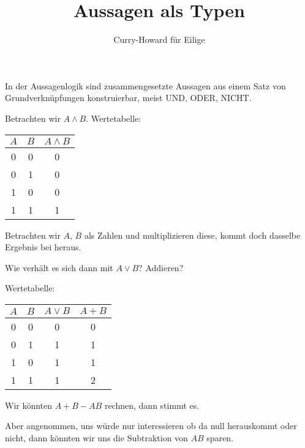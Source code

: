\documentclass[9pt]{beamer}
\title{Aussagen als Typen}
\subtitle{Curry-Howard für Eilige}
\date{}
\begin{document}
\begin{frame}
\maketitle
\end{frame}

\begin{frame}
In der Aussagenlogik sind zusammengesetzte Aussagen aus einem
Satz von Grundverknüpfungen konstruierbar, meist UND, ODER, NICHT.\pause

\vspace{1em}
Betrachten wir $A\land B$.\pause{} Wertetabelle:

\begin{table}
\begin{tabular}{ccc}
$A$ & $B$ & $A\land B$\\
\midrule
0 & 0 & 0\\
0 & 1 & 0\\
1 & 0 & 0\\
1 & 1 & 1
\end{tabular}
\end{table}\pause

Betrachten wir $A$, $B$ als Zahlen und multiplizieren diese,
kommt doch dasselbe Ergebnis bei heraus.
\end{frame}

\begin{frame}
Wie verhält es sich dann mit $A\lor B$?\pause{} Addieren?\pause

\vspace{1em}
Wertetabelle:
\begin{table}
\begin{tabular}{cccc}
$A$ & $B$ & $A\lor B$ & $A + B$\\
\midrule
0 & 0 & 0 & 0\\
0 & 1 & 1 & 1\\
1 & 0 & 1 & 1\\
1 & 1 & 1 & 2
\end{tabular}
\end{table}\pause
Wir könnten $A+B - AB$ rechnen, dann stimmt es.\pause

\vspace{1em}
Aber angenommen, uns würde nur interessieren ob da null herauskommt
oder nicht, dann könnten wir uns die Subtraktion von $AB$ sparen.
\end{frame}
\end{document}

